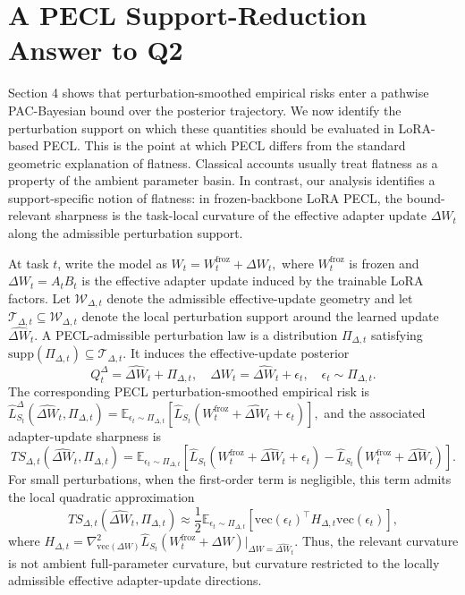 \documentclass{article}
\begin{document}
\section{A PECL Support-Reduction Answer to Q2}

Section 4 shows that perturbation-smoothed empirical risks enter a pathwise PAC-Bayesian bound over the posterior trajectory. We now identify the perturbation support on which these quantities should be evaluated in LoRA-based PECL. This is the point at which PECL differs from the standard geometric explanation of flatness. Classical accounts usually treat flatness as a property of the ambient parameter basin. In contrast, our analysis identifies a support-specific notion of flatness: in frozen-backbone LoRA PECL, the bound-relevant sharpness is the task-local curvature of the effective adapter update $\Delta W_t$ along the admissible perturbation support.

At task $t$, write the model as
$
W_t = W_t^{\mathrm{froz}} + \Delta W_t,
$
where $W_t^{\mathrm{froz}}$ is frozen and $\Delta W_t= A_tB_t$ is the effective adapter update induced by the trainable LoRA factors. Let $\mathcal W_{\Delta,t}$ denote the admissible effective-update geometry and let $\mathcal T_{\Delta,t}\subseteq \mathcal W_{\Delta,t}$ denote the local perturbation support around the learned update $\widehat{\Delta W}_t$. A PECL-admissible perturbation law is a distribution $\Pi_{\Delta,t}$ satisfying
$
\mathrm{supp}(\Pi_{\Delta,t})\subseteq \mathcal T_{\Delta,t}.
$
It induces the effective-update posterior
$$
Q_t^\Delta = \widehat{\Delta W}_t+\Pi_{\Delta,t},
\quad
\Delta W_t=\widehat{\Delta W}_t+\epsilon_t,
\quad
\epsilon_t\sim \Pi_{\Delta,t}.
$$
The corresponding PECL perturbation-smoothed empirical risk is
$
\widehat L_{S_t}^{\Delta}
(
\widehat{\Delta W}_t,\Pi_{\Delta,t}
)
=
\mathbb E_{\epsilon_t\sim\Pi_{\Delta,t}}
[
\widehat L_{S_t}
(
W_t^{\mathrm{froz}}+\widehat{\Delta W}_t+\epsilon_t
)
],
$
and the associated adapter-update sharpness is
$$
TS_{\Delta,t}
(
\widehat{\Delta W}_t,\Pi_{\Delta,t}
)
=
\mathbb E_{\epsilon_t\sim\Pi_{\Delta,t}}
[
\widehat L_{S_t}
(
W_t^{\mathrm{froz}}+\widehat{\Delta W}_t+\epsilon_t
)
-
\widehat L_{S_t}
(
W_t^{\mathrm{froz}}+\widehat{\Delta W}_t
)
].
$$
For small perturbations, when the first-order term is negligible, this term admits the local quadratic approximation
$$
TS_{\Delta,t}
(
\widehat{\Delta W}_t,\Pi_{\Delta,t}
)
\approx
\frac{1}{2}
\mathbb E_{\epsilon_t\sim\Pi_{\Delta,t}}
\left[
\mathrm{vec}(\epsilon_t)^\top
H_{\Delta,t}
\mathrm{vec}(\epsilon_t)
\right],
$$
where
$
H_{\Delta,t}
=
\nabla_{\mathrm{vec}(\Delta W)}^2
\widehat L_{S_t}
(
W_t^{\mathrm{froz}}+\Delta W
)
\big|_{\Delta W=\widehat{\Delta W}_t}.
$
Thus, the relevant curvature is not ambient full-parameter curvature, but curvature restricted to the locally admissible effective adapter-update directions.
\end{document}
